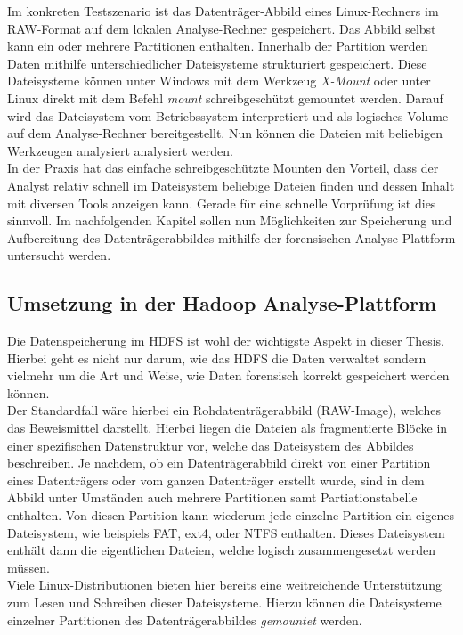 \noindent
Im konkreten Testszenario ist das Datenträger-Abbild eines Linux-Rechners im RAW-Format auf dem lokalen Analyse-Rechner gespeichert. Das Abbild selbst kann ein oder mehrere Partitionen enthalten. Innerhalb der Partition werden Daten mithilfe unterschiedlicher Dateisysteme strukturiert gespeichert. Diese Dateisysteme können unter Windows mit dem Werkzeug \textit{X-Mount} oder unter Linux direkt mit dem Befehl \textit{mount} schreibgeschützt gemountet werden. Darauf wird das Dateisystem vom Betriebssystem interpretiert und als logisches Volume auf dem Analyse-Rechner bereitgestellt. Nun können die Dateien mit beliebigen Werkzeugen analysiert analysiert werden.\\

\noindent
In der Praxis hat das einfache schreibgeschützte Mounten den Vorteil, dass der Analyst relativ schnell im Dateisystem beliebige Dateien finden und dessen Inhalt mit diversen Tools anzeigen kann. Gerade für eine schnelle Vorprüfung ist dies sinnvoll. Im nachfolgenden Kapitel sollen nun Möglichkeiten zur Speicherung und Aufbereitung des Datenträgerabbildes mithilfe der forensischen Analyse-Plattform untersucht werden.


\subsection{Umsetzung in der Hadoop Analyse-Plattform}

Die Datenspeicherung im HDFS ist wohl der wichtigste Aspekt in dieser Thesis. Hierbei geht es nicht nur darum, wie das HDFS die Daten verwaltet sondern vielmehr um die Art und Weise, wie Daten forensisch korrekt gespeichert werden können.\\

\noindent
Der Standardfall wäre hierbei ein Rohdatenträgerabbild (RAW-Image), welches das Beweismittel darstellt. Hierbei liegen die Dateien als fragmentierte Blöcke in einer spezifischen Datenstruktur vor, welche das Dateisystem des Abbildes beschreiben. Je nachdem, ob ein Datenträgerabbild direkt von einer Partition eines Datenträgers oder vom ganzen Datenträger erstellt wurde, sind in dem Abbild unter Umständen auch mehrere Partitionen samt Partiationstabelle enthalten. Von diesen Partition kann wiederum jede einzelne Partition ein eigenes Dateisystem, wie beispiels FAT, ext4, oder NTFS enthalten. Dieses Dateisystem enthält dann die eigentlichen Dateien, welche logisch zusammengesetzt werden müssen.\\ Viele Linux-Distributionen bieten hier bereits eine weitreichende Unterstützung zum Lesen und Schreiben dieser Dateisysteme. Hierzu können die Dateisysteme einzelner Partitionen des Datenträgerabbildes \textit{gemountet} werden.\\


